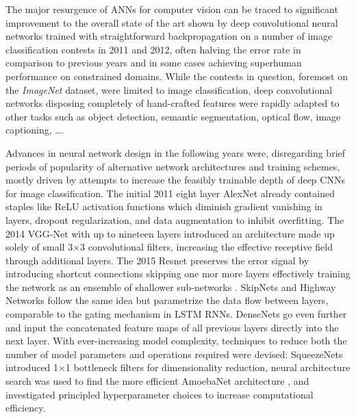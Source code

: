 The major resurgence of ANNs for computer vision can be traced to significant
improvement to the overall state of the art shown by deep convolutional neural
networks trained with straightforward backpropagation on a number of image
classification contests in 2011 and 2012, often halving the error rate in
comparison to previous years and in some cases achieving superhuman performance
on constrained domains. While the contests in question, foremost on the
\emph{ImageNet} dataset, were limited to image classification, deep
convolutional networks disposing completely of hand-crafted features were
rapidly adapted to other tasks such as object detection, semantic segmentation,
optical flow, image captioning, \dots.

Advances in neural network design in the following years were, disregarding
brief periods of popularity of alternative network architectures and training
schemes, mostly driven by attempts to increase the feasibly trainable depth of
deep CNNs for image classification. The initial 2011 eight layer AlexNet
\cite{krizhevsky2017imagenet} already contained staples like ReLU activation
functions which diminish gradient vanishing in layers, dropout regularization,
and data augmentation to inhibit overfitting. The 2014
VGG-Net\cite{simonyan2014very} with up to nineteen layers introduced an
architecture made up solely of small 3$\times$3 convolutional filters, increasing
the effective receptive field through additional layers. The 2015 Resnet
\cite{he2016deep} preserves the error signal by introducing shortcut
connections skipping one mor more layers effectively training the network as an
ensemble of shallower sub-networks \cite{veit2016residual}. SkipNets
\cite{wang2018skipnet} and Highway Networks \cite{srivastava2015training}
follow the same idea but parametrize the data flow between layers, comparable
to the gating mechanism in LSTM RNNs. DenseNets \cite{huang2017densely} go even
further and input the concatenated feature maps of all previous layers directly
into the next layer. With ever-increasing model complexity, techniques to
reduce both the number of model parameters and operations required were
devised: SqueezeNets \cite{iandola2016squeezenet} introduced 1$\times$1
bottleneck filters for dimensionality reduction, neural architecture search was
used to find the more efficient AmoebaNet architecture
\cite{real2019regularized}, and \cite{tan2019efficientnet} investigated
principled hyperparameter choices to increase computational efficiency.

